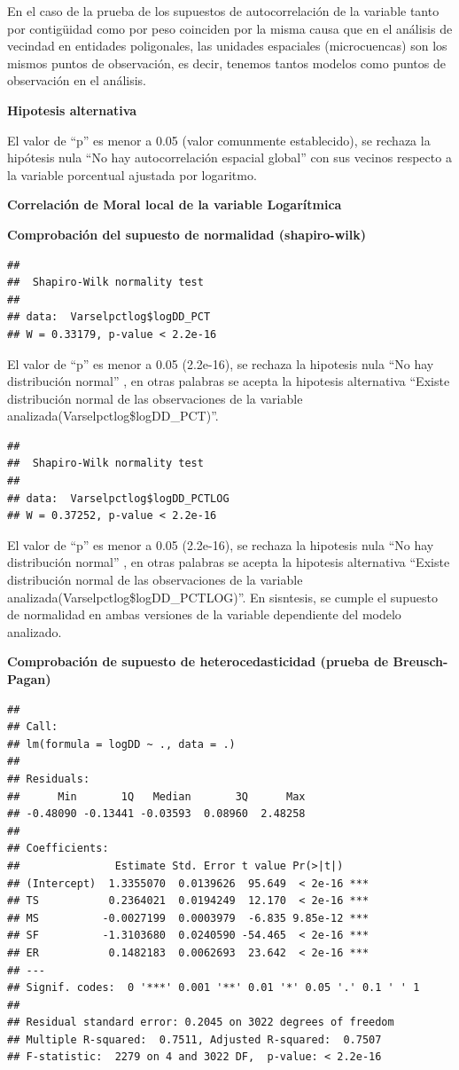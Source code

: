 \documentclass[11pt,]{article}
\begin{document}
En el caso de la prueba de los supuestos de autocorrelación de la
variable tanto por contigüidad como por peso coinciden por la misma
causa que en el análisis de vecindad en entidades poligonales, las
unidades espaciales (microcuencas) son los mismos puntos de observación,
es decir, tenemos tantos modelos como puntos de observación en el
análisis.

\textbf{Hipotesis alternativa}

El valor de ``p'' es menor a 0.05 (valor comunmente establecido), se
rechaza la hipótesis nula ``No hay autocorrelación espacial global'' con
sus vecinos respecto a la variable porcentual ajustada por logaritmo.

\textbf{Correlación de Moral local de la variable Logarítmica}

\textbf{Comprobación del supuesto de normalidad (shapiro-wilk)}

\begin{verbatim}
## 
##  Shapiro-Wilk normality test
## 
## data:  Varselpctlog$logDD_PCT
## W = 0.33179, p-value < 2.2e-16
\end{verbatim}

El valor de ``p'' es menor a 0.05 (2.2e-16), se rechaza la hipotesis
nula ``No hay distribución normal'' , en otras palabras se acepta la
hipotesis alternativa ``Existe distribución normal de las observaciones
de la variable analizada(Varselpctlog\$logDD\_PCT)''.

\begin{verbatim}
## 
##  Shapiro-Wilk normality test
## 
## data:  Varselpctlog$logDD_PCTLOG
## W = 0.37252, p-value < 2.2e-16
\end{verbatim}

El valor de ``p'' es menor a 0.05 (2.2e-16), se rechaza la hipotesis
nula ``No hay distribución normal'' , en otras palabras se acepta la
hipotesis alternativa ``Existe distribución normal de las observaciones
de la variable analizada(Varselpctlog\$logDD\_PCTLOG)''. En sisntesis,
se cumple el supuesto de normalidad en ambas versiones de la variable
dependiente del modelo analizado.

\textbf{Comprobación de supuesto de heterocedasticidad (prueba de
Breusch-Pagan)}

\begin{verbatim}
## 
## Call:
## lm(formula = logDD ~ ., data = .)
## 
## Residuals:
##      Min       1Q   Median       3Q      Max 
## -0.48090 -0.13441 -0.03593  0.08960  2.48258 
## 
## Coefficients:
##               Estimate Std. Error t value Pr(>|t|)    
## (Intercept)  1.3355070  0.0139626  95.649  < 2e-16 ***
## TS           0.2364021  0.0194249  12.170  < 2e-16 ***
## MS          -0.0027199  0.0003979  -6.835 9.85e-12 ***
## SF          -1.3103680  0.0240590 -54.465  < 2e-16 ***
## ER           0.1482183  0.0062693  23.642  < 2e-16 ***
## ---
## Signif. codes:  0 '***' 0.001 '**' 0.01 '*' 0.05 '.' 0.1 ' ' 1
## 
## Residual standard error: 0.2045 on 3022 degrees of freedom
## Multiple R-squared:  0.7511, Adjusted R-squared:  0.7507 
## F-statistic:  2279 on 4 and 3022 DF,  p-value: < 2.2e-16
\end{verbatim}
\end{document}
